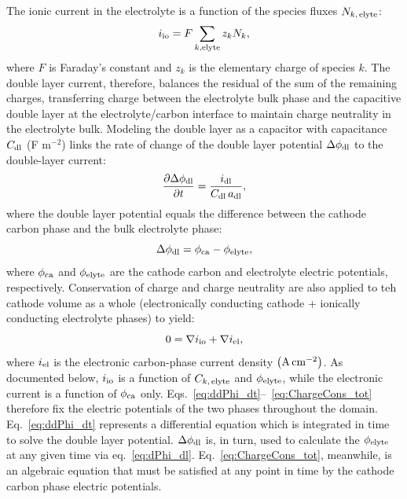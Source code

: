 \documentclass{elsarticle}
\begin{document}
The ionic current in the electrolyte is a function of the species fluxes $N_{k,\,{\rm elyte}}$:
\begin{equation}\label{eq:i_io}
    i_{\rm io} = F\sum_{k,{\rm elyte}} z_kN_{k},
\end{equation}
where $F$ is Faraday's constant and $z_k$ is the elementary charge of species $k$. The double layer current, therefore, balances the residual of the sum of the remaining charges, transferring charge between the electrolyte bulk phase and the capacitive double layer at the electrolyte/carbon interface to maintain charge neutrality in the electrolyte bulk. Modeling the double layer as a capacitor with capacitance $C_{\rm dl}$ (F m$^{-2}$) links the rate of change of the double layer potential $\Delta \phi_{\rm dl}$ to the double-layer current:
\begin{equation}\label{eq:ddPhi_dt}
    \frac{\partial \Delta \phi_{\rm dl}}{\partial t} = \frac{i_{\rm dl}}{C_{\rm dl}\,a_{\rm dl}},
\end{equation}
where the double layer potential equals the difference between the cathode carbon phase and the bulk electrolyte phase:
\begin{equation}\label{eq:dPhi_dl}
    \Delta \phi_{\rm dl} = \phi_{\rm ca} - \phi_{\rm elyte},
\end{equation}
where $\phi_{\rm ca}$ and $\phi_{\rm elyte}$ are the cathode carbon and electrolyte electric potentials, respectively. Conservation of charge and charge neutrality are also applied to teh cathode volume as a whole (electronically conducting cathode + ionically conducting electrolyte phases) to yield:
\begin{equation}\label{eq:ChargeCons_tot}
    0 = \nabla i_{\rm io} + \nabla i_{\rm el},
\end{equation}
where $i_{\rm el}$ is the electronic carbon-phase current density $\left({\rm A\,cm^{-2}} \right)$. As documented below, $i_{\rm io}$ is a function of $C_{k,\,{\rm elyte}}$ and $\phi_{\rm elyte}$, while the electronic current is a function of $\phi_{\rm ca}$ only.  Eqs.~\ref{eq:ddPhi_dt}--~\ref{eq:ChargeCons_tot} therefore fix the electric potentials of the two phases throughout the domain. Eq.~\ref{eq:ddPhi_dt} represents a differential equation which is integrated in time to solve the double layer potential. $\Delta \phi_{\rm dl}$ is, in turn, used to calculate the $\phi_{\rm elyte}$ at any given time via eq.~\ref{eq:dPhi_dl}. Eq.~\ref{eq:ChargeCons_tot}, meanwhile, is an algebraic equation that must be satisfied at any point in time by the cathode carbon phase electric potentials. 
\end{document}
